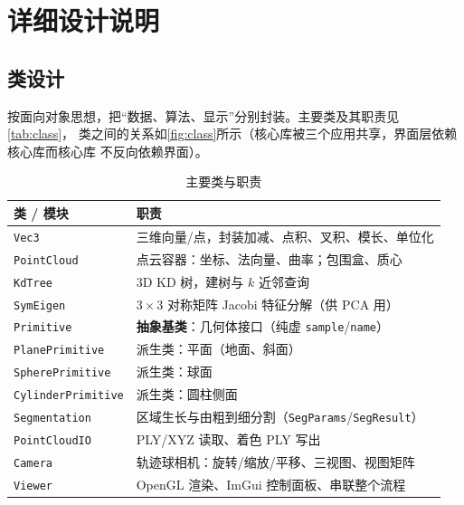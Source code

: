 \section{详细设计说明}

\subsection{类设计}
按面向对象思想，把“数据、算法、显示”分别封装。主要类及其职责见\autoref{tab:class}，
类之间的关系如\autoref{fig:class}所示（核心库被三个应用共享，界面层依赖核心库而核心库
不反向依赖界面）。

\begin{table}[!htb]
  \centering
  \caption{主要类与职责}\label{tab:class}
  \begin{tabular}{@{}lp{9.5cm}@{}}
    \toprule
    类 / 模块 & 职责 \\
    \midrule
    \texttt{Vec3}        & 三维向量/点，封装加减、点积、叉积、模长、单位化 \\
    \texttt{PointCloud}  & 点云容器：坐标、法向量、曲率；包围盒、质心 \\
    \texttt{KdTree}      & 3D KD 树，建树与 $k$ 近邻查询 \\
    \texttt{SymEigen}    & $3\times3$ 对称矩阵 Jacobi 特征分解（供 PCA 用） \\
    \texttt{Primitive}   & \textbf{抽象基类}：几何体接口（纯虚 \texttt{sample}/\texttt{name}） \\
    \quad\texttt{PlanePrimitive} & 派生类：平面（地面、斜面） \\
    \quad\texttt{SpherePrimitive} & 派生类：球面 \\
    \quad\texttt{CylinderPrimitive} & 派生类：圆柱侧面 \\
    \texttt{Segmentation}& 区域生长与由粗到细分割（\texttt{SegParams}/\texttt{SegResult}） \\
    \texttt{PointCloudIO}& PLY/XYZ 读取、着色 PLY 写出 \\
    \texttt{Camera}      & 轨迹球相机：旋转/缩放/平移、三视图、视图矩阵 \\
    \texttt{Viewer}      & OpenGL 渲染、ImGui 控制面板、串联整个流程 \\
    \bottomrule
  \end{tabular}
\end{table}

